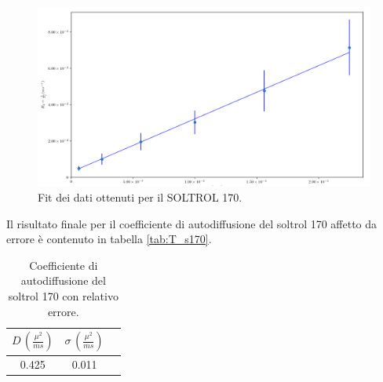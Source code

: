 \begin{figure}[h!]
\centering
\includegraphics[width=\columnwidth]{Figure/SOLTROL170_calc.png}
\caption{Fit dei dati ottenuti per il SOLTROL 170.}
\label{fig:Df_s170}
\end{figure}
\newpage
Il risultato finale per il coefficiente di autodiffusione del soltrol 170 affetto da errore è contenuto in tabella \ref{tab:T_s170}. 
\begin{table}[h!]
    \begin{center}
    \begin{tabular}{c c c}
    \toprule
    	$D\,(\frac{{\mu}^2}{ms})$ & $\sigma\,(\frac{{\mu}^2}{ms})$ \\
    \midrule
    	0.425	&	0.011	\\
    \bottomrule
    \end{tabular}
    \caption{Coefficiente di autodiffusione del soltrol 170 con relativo errore.}
    \label{tab:Df_s170}
    \end{center}
\end{table}




